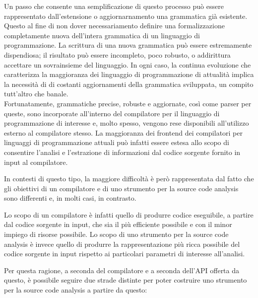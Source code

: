 Un passo che consente una semplificazione di questo processo può essere
rappresentato dall'estensione o aggiornarnamento una grammatica già esistente.
Questo al fine di non dover necessariamento definire una formalizzazione
completamente nuova dell'intera grammatica di un linguaggio di programmazione.
La scrittura di una nuova grammatica può essere estremamente dispendiosa; il
risultato può essere incompleto, poco robusto, o addirittura accettare un
sovrainsieme del linguaggio. In ogni caso, la continua evoluzione che
caratterizza la maggioranza dei linguaggio di programmazione di attualità
implica la necessità di di costanti aggiornamenti della grammatica sviluppata,
un compito tutt’altro che banale.\\

Fortunatamente, grammatiche precise, robuste e aggiornate, così come parser per
queste, sono incorporate all’interno del compilatore per il linguaggio di
programmazione di interesse e, molto spesso, vengono rese disponibili
all’utilizzo esterno al compilatore stesso. La maggioranza dei frontend dei
compilatori per linguaggi di programmazione attuali può infatti essere estesa
allo scopo di consentire l’analisi e l’estrazione di informazioni dal codice
sorgente fornito in input al compilatore.

In contesti di questo tipo, la maggiore difficoltà è però rappresentata dal
fatto che gli obiettivi di un compilatore e di uno strumento per la source code
analysis sono differenti e, in molti casi, in contrasto.

Lo scopo di un compilatore è infatti quello di produrre codice eseguibile, a
partire dal codice sorgente in input, che sia il più efficiente possibile e con
il minor impiego di risorse possibile. Lo scopo di uno strumento per la source
code analysis è invece quello di produrre la rappresentazione più ricca
possibile del codice sorgente in input rispetto ai particolari parametri di
interesse all’analisi.

Per questa ragione, a seconda del compilatore e a seconda dell’API offerta da
questo, è possibile seguire due strade distinte per poter costruire uno
strumento per la source code analysis a partire da questo:

